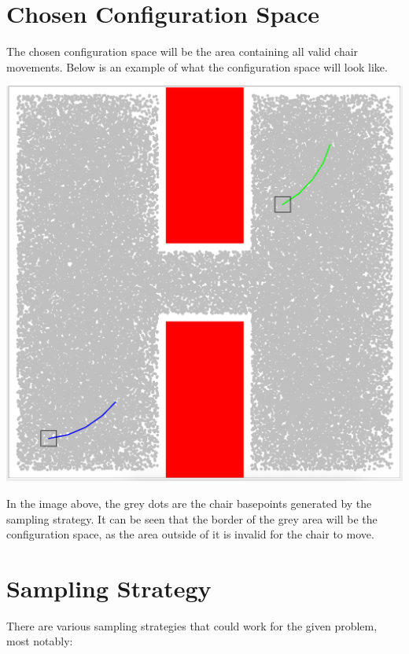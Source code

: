 \documentclass[12pt]{article}
\begin{document}
    \maketitle

    \section{Chosen Configuration Space}

    The chosen configuration space will be the area containing all valid chair movements. Below is an example of what the configuration space will look like.

    \includegraphics[scale=0.5]{resources/c-space.png}

    In the image above, the grey dots are the chair basepoints generated by the sampling strategy. It can be seen that the border of the grey area will be the configuration space, as the area outside of it is invalid for the chair to move.

    \section{Sampling Strategy}

    There are various sampling strategies that could work for the given problem, most notably:
\end{document}
